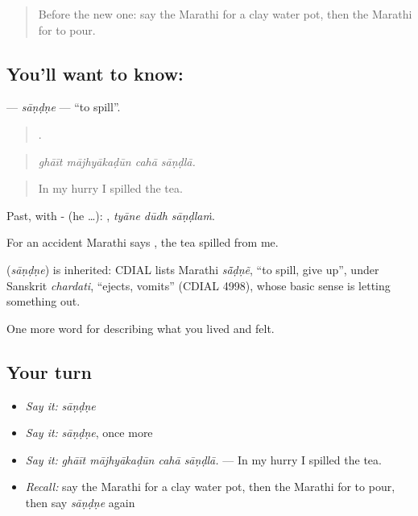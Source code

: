 \label{lesson:MR-C525-sandne}



\begin{quote}
Before the new one: say the Marathi for a clay water pot, then the Marathi for to pour.
\end{quote}

\subsection*{You'll want to know: }
\textbf{} — \emph{sāṇḍṇe} — \textquotedblleft{}to spill\textquotedblright{}.

\begin{quote}
   .
\end{quote}

\begin{quote}
\emph{ghāīt mājhyākaḍūn cahā sāṇḍlā.}
\end{quote}

\begin{quote}
In my hurry I spilled the tea.
\end{quote}

Past, with - (he …):   , \emph{tyāne dūdh sāṇḍlaṁ}.

For an accident Marathi says   , the tea spilled from me.

\begin{cousinweb}
\textbf{} (\emph{sāṇḍṇe}) is inherited: CDIAL lists Marathi \emph{sā̃ḍṇẽ}, \textquotedblleft{}to spill, give up\textquotedblright{}, under Sanskrit \emph{chardati}, \textquotedblleft{}ejects, vomits\textquotedblright{} (CDIAL 4998), whose basic sense is letting something out.
\end{cousinweb}

\begin{grammarlens}[title={What you've built}]
One more word for describing what you lived and felt.
\end{grammarlens}

\subsection*{Your turn}
\begin{itemize}
\raggedright
  \item \emph{Say it:} \emph{sāṇḍṇe}
  \item \emph{Say it:} \emph{sāṇḍṇe}, once more
  \item \emph{Say it:} \emph{ghāīt mājhyākaḍūn cahā sāṇḍlā.} — In my hurry I spilled the tea.
  \item \emph{Recall:} say the Marathi for a clay water pot, then the Marathi for to pour, then say \emph{sāṇḍṇe} again
\end{itemize}

